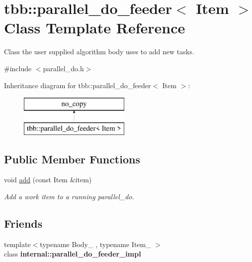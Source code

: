 \hypertarget{classtbb_1_1parallel__do__feeder}{}\section{tbb\+:\+:parallel\+\_\+do\+\_\+feeder$<$ Item $>$ Class Template Reference}
\label{classtbb_1_1parallel__do__feeder}


Class the user supplied algorithm body uses to add new tasks.  




{\ttfamily \#include $<$parallel\+\_\+do.\+h$>$}

Inheritance diagram for tbb\+:\+:parallel\+\_\+do\+\_\+feeder$<$ Item $>$\+:\begin{figure}[H]
\begin{center}
\leavevmode
\includegraphics[height=2.000000cm]{classtbb_1_1parallel__do__feeder}
\end{center}
\end{figure}
\subsection*{Public Member Functions}
\begin{DoxyCompactItemize}
\item 
\hypertarget{classtbb_1_1parallel__do__feeder_ac095c6b1a32e9c0be010aa32875d7a63}{}void \hyperlink{classtbb_1_1parallel__do__feeder_ac095c6b1a32e9c0be010aa32875d7a63}{add} (const Item \&item)\label{classtbb_1_1parallel__do__feeder_ac095c6b1a32e9c0be010aa32875d7a63}

\begin{DoxyCompactList}\small\item\em Add a work item to a running parallel\+\_\+do. \end{DoxyCompactList}\end{DoxyCompactItemize}
\subsection*{Friends}
\begin{DoxyCompactItemize}
\item 
\hypertarget{classtbb_1_1parallel__do__feeder_ae5c8cc31bc27b79377687e3de76f480e}{}{\footnotesize template$<$typename Body\+\_\+ , typename Item\+\_\+ $>$ }\\class {\bfseries internal\+::parallel\+\_\+do\+\_\+feeder\+\_\+impl}\label{classtbb_1_1parallel__do__feeder_ae5c8cc31bc27b79377687e3de76f480e}

\end{DoxyCompactItemize}


